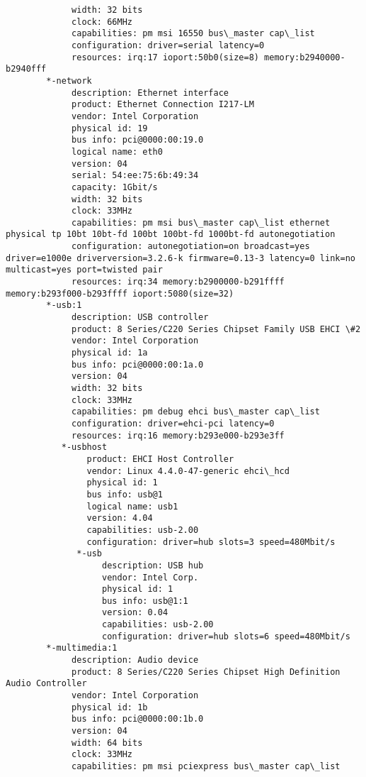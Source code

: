 \begin{verbatim}
             width: 32 bits
             clock: 66MHz
             capabilities: pm msi 16550 bus\_master cap\_list
             configuration: driver=serial latency=0
             resources: irq:17 ioport:50b0(size=8) memory:b2940000-b2940fff
        *-network
             description: Ethernet interface
             product: Ethernet Connection I217-LM
             vendor: Intel Corporation
             physical id: 19
             bus info: pci@0000:00:19.0
             logical name: eth0
             version: 04
             serial: 54:ee:75:6b:49:34
             capacity: 1Gbit/s
             width: 32 bits
             clock: 33MHz
             capabilities: pm msi bus\_master cap\_list ethernet physical tp 10bt 10bt-fd 100bt 100bt-fd 1000bt-fd autonegotiation
             configuration: autonegotiation=on broadcast=yes driver=e1000e driverversion=3.2.6-k firmware=0.13-3 latency=0 link=no multicast=yes port=twisted pair
             resources: irq:34 memory:b2900000-b291ffff memory:b293f000-b293ffff ioport:5080(size=32)
        *-usb:1
             description: USB controller
             product: 8 Series/C220 Series Chipset Family USB EHCI \#2
             vendor: Intel Corporation
             physical id: 1a
             bus info: pci@0000:00:1a.0
             version: 04
             width: 32 bits
             clock: 33MHz
             capabilities: pm debug ehci bus\_master cap\_list
             configuration: driver=ehci-pci latency=0
             resources: irq:16 memory:b293e000-b293e3ff
           *-usbhost
                product: EHCI Host Controller
                vendor: Linux 4.4.0-47-generic ehci\_hcd
                physical id: 1
                bus info: usb@1
                logical name: usb1
                version: 4.04
                capabilities: usb-2.00
                configuration: driver=hub slots=3 speed=480Mbit/s
              *-usb
                   description: USB hub
                   vendor: Intel Corp.
                   physical id: 1
                   bus info: usb@1:1
                   version: 0.04
                   capabilities: usb-2.00
                   configuration: driver=hub slots=6 speed=480Mbit/s
        *-multimedia:1
             description: Audio device
             product: 8 Series/C220 Series Chipset High Definition Audio Controller
             vendor: Intel Corporation
             physical id: 1b
             bus info: pci@0000:00:1b.0
             version: 04
             width: 64 bits
             clock: 33MHz
             capabilities: pm msi pciexpress bus\_master cap\_list

\end{verbatim}
